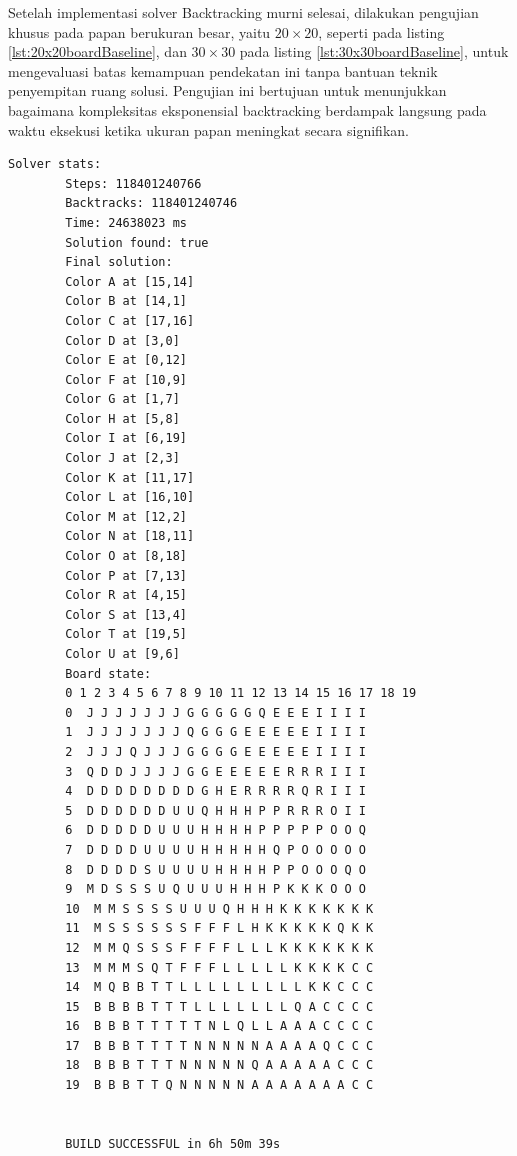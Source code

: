 \documentclass[a4paper,twoside]{article}
\begin{document}
	
	Setelah implementasi solver Backtracking murni selesai, dilakukan pengujian khusus pada papan berukuran besar, yaitu $20 \times 20$, seperti pada listing {\ref{lst:20x20boardBaseline}}, dan $30 \times 30$ pada listing {\ref{lst:30x30boardBaseline}}, untuk mengevaluasi batas kemampuan pendekatan ini tanpa bantuan teknik penyempitan ruang solusi. Pengujian ini bertujuan untuk menunjukkan bagaimana kompleksitas eksponensial backtracking berdampak langsung pada waktu eksekusi ketika ukuran papan meningkat secara signifikan.
	\begin{lstlisting}[basicstyle=\ttfamily\scriptsize, caption={Tolok ukur untuk papan $20 \times 20$}, label={lst:20x20boardBaseline}]
		Solver stats:
		Steps: 118401240766
		Backtracks: 118401240746
		Time: 24638023 ms
		Solution found: true
		Final solution:
		Color A at [15,14]
		Color B at [14,1]
		Color C at [17,16]
		Color D at [3,0]
		Color E at [0,12]
		Color F at [10,9]
		Color G at [1,7]
		Color H at [5,8]
		Color I at [6,19]
		Color J at [2,3]
		Color K at [11,17]
		Color L at [16,10]
		Color M at [12,2]
		Color N at [18,11]
		Color O at [8,18]
		Color P at [7,13]
		Color R at [4,15]
		Color S at [13,4]
		Color T at [19,5]
		Color U at [9,6]
		Board state:
		0 1 2 3 4 5 6 7 8 9 10 11 12 13 14 15 16 17 18 19
		0  J J J J J J J G G G G G Q E E E I I I I
		1  J J J J J J J Q G G G E E E E E I I I I
		2  J J J Q J J J G G G G E E E E E I I I I
		3  Q D D J J J J G G E E E E E R R R I I I
		4  D D D D D D D D G H E R R R R Q R I I I
		5  D D D D D D U U Q H H H P P R R R O I I
		6  D D D D D U U U H H H H P P P P P O O Q
		7  D D D D U U U U H H H H H Q P O O O O O
		8  D D D D S U U U U H H H H P P O O O Q O
		9  M D S S S U Q U U U H H H P K K K O O O
		10  M M S S S S U U U Q H H H K K K K K K K
		11  M S S S S S S F F F L H K K K K K Q K K
		12  M M Q S S S F F F F L L L K K K K K K K
		13  M M M S Q T F F F L L L L L K K K K C C
		14  M Q B B T T L L L L L L L L L K K C C C
		15  B B B B T T T L L L L L L L Q A C C C C
		16  B B B T T T T T N L Q L L A A A C C C C
		17  B B B T T T T N N N N N A A A A Q C C C
		18  B B B T T T N N N N N Q A A A A A C C C
		19  B B B T T Q N N N N N A A A A A A A C C
		
		
		BUILD SUCCESSFUL in 6h 50m 39s
	\end{lstlisting}
	
\end{document}
